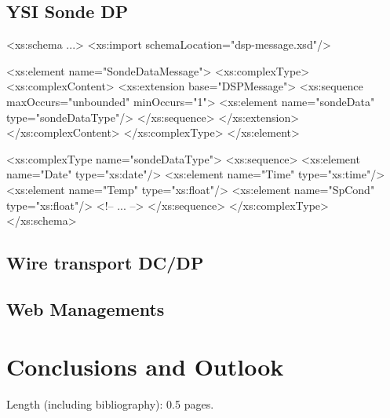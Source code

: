 \documentclass[conference]{IEEEtran}
\begin{document}
\subsection{YSI Sonde DP}

\begin{code}
<xs:schema ...>
<xs:import schemaLocation="dsp-message.xsd"/>

<xs:element name="SondeDataMessage">
  <xs:complexType>
    <xs:complexContent>
      <xs:extension base="DSPMessage">
        <xs:sequence maxOccurs="unbounded"
                     minOccurs="1">
          <xs:element name="sondeData"
                      type="sondeDataType"/>
        </xs:sequence>
      </xs:extension>
    </xs:complexContent>
  </xs:complexType>
</xs:element>

<xs:complexType name="sondeDataType">
  <xs:sequence>
    <xs:element name="Date" type="xs:date"/>
    <xs:element name="Time" type="xs:time"/>
    <xs:element name="Temp" type="xs:float"/>
    <xs:element name="SpCond" type="xs:float"/>
    <!-- ... -->
  </xs:sequence>
</xs:complexType>
</xs:schema>
\end{code}

\subsection{Wire transport DC/DP}

\subsection{Web Managements}


\section{Conclusions and Outlook}

Length (including bibliography): 0.5 pages.
\end{document}
